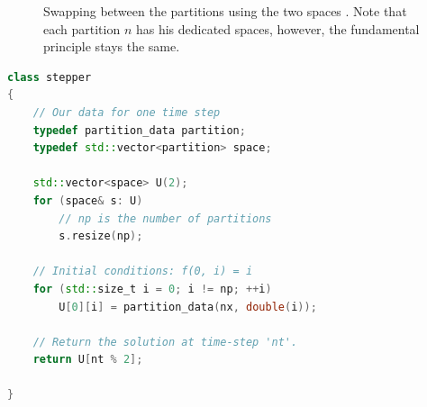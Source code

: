 \begin{figure}[tb]
\centering
{}
\caption{Swapping between the partitions using the two spaces . Note that each partition $n$ has his dedicated spaces, however, the fundamental principle stays the same.}
\label{heat:swapping:partition}
\end{figure}



\begin{lstlisting}[language=c++,caption={Serial implementation of the one-dimensional heat equation with grain size control. \label{code:heat:grain:size:stepper}},float,floatplacement=tbp]
class stepper
{
    // Our data for one time step
    typedef partition_data partition;
    typedef std::vector<partition> space;
    
    std::vector<space> U(2);
    for (space& s: U)
        // np is the number of partitions
        s.resize(np);
        
    // Initial conditions: f(0, i) = i
    for (std::size_t i = 0; i != np; ++i)
        U[0][i] = partition_data(nx, double(i));
        
    // Return the solution at time-step 'nt'.
    return U[nt % 2];
    
}
\end{lstlisting}


\newpage
\theendnotes